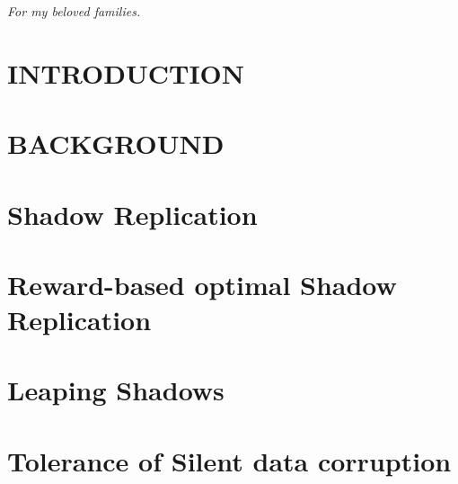 \documentclass[pdftex,final]{pittetd}   %
\begin{document}
\tableofcontents
\listoftables                     %
\listoffigures                    %
\preface
\vfill
\begin{center}
\textit{For my beloved families.} 
\end{center}
\vfill
%
\chapter{INTRODUCTION}
\label{chapter:intro}


\chapter{BACKGROUND}
\label{chapter:background}


\chapter{Shadow Replication}
\label{chapter:shadowing}


\chapter{Reward-based optimal Shadow Replication}
\label{chapter:reward}


\chapter{Leaping Shadows}
\label{chapter:scale}


\chapter{Tolerance of Silent data corruption}
\label{chapter:sdc}

\end{document}
